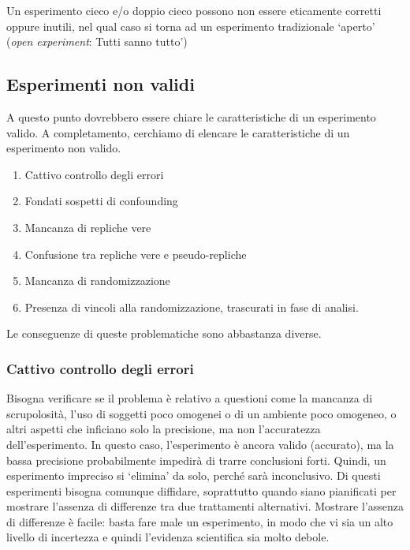 \documentclass[a4paper,12pt,oneside]{book}
\providecommand{\tightlist}{%
  \setlength{\itemsep}{0pt}\setlength{\parskip}{0pt}}
\begin{document}
Un esperimento cieco e/o doppio cieco possono non essere eticamente
corretti oppure inutili, nel qual caso si torna ad un esperimento
tradizionale `aperto' (\emph{open experiment}: Tutti sanno tutto')

\subsection{Esperimenti non validi}\label{esperimenti-non-validi}

A questo punto dovrebbero essere chiare le caratteristiche di un
esperimento valido. A completamento, cerchiamo di elencare le
caratteristiche di un esperimento non valido.

\begin{enumerate}
\def\labelenumi{\arabic{enumi}.}
\tightlist
\item
  Cattivo controllo degli errori
\item
  Fondati sospetti di confounding
\item
  Mancanza di repliche vere
\item
  Confusione tra repliche vere e pseudo-repliche
\item
  Mancanza di randomizzazione
\item
  Presenza di vincoli alla randomizzazione, trascurati in fase di
  analisi.
\end{enumerate}

Le conseguenze di queste problematiche sono abbastanza diverse.

\subsubsection{Cattivo controllo degli
errori}\label{cattivo-controllo-degli-errori}

Bisogna verificare se il problema è relativo a questioni come la
mancanza di scrupolosità, l'uso di soggetti poco omogenei o di un
ambiente poco omogeneo, o altri aspetti che inficiano solo la
precisione, ma non l'accuratezza dell'esperimento. In questo caso,
l'esperimento è ancora valido (accurato), ma la bassa precisione
probabilmente impedirà di trarre conclusioni forti. Quindi, un
esperimento impreciso si `elimina' da solo, perché sarà inconclusivo. Di
questi esperimenti bisogna comunque diffidare, soprattutto quando siano
pianificati per mostrare l'assenza di differenze tra due trattamenti
alternativi. Mostrare l'assenza di differenze è facile: basta fare male
un esperimento, in modo che vi sia un alto livello di incertezza e
quindi l'evidenza scientifica sia molto debole.
\end{document}
